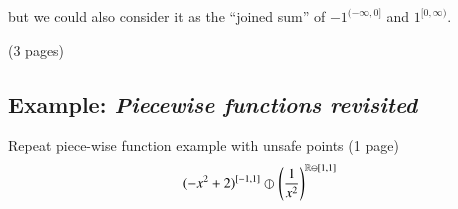 but we could also consider it as the ``joined sum'' of $-1^{(-\infty, 0]}$ and $1^{[0, \infty)}$.

(3 pages)

\newpage \addtocounter{page}{2}

\subsection{Example: \emph{Piecewise functions revisited}}
Repeat piece-wise function example with unsafe points (1 page)
\begin{equation}
(-x^2+2)^{[-1,1]} \varobar^{} \left( \frac{1}{x^2} \right)^{\mathbb{R} \ominus [1,1]}
\end{equation}


\newpage